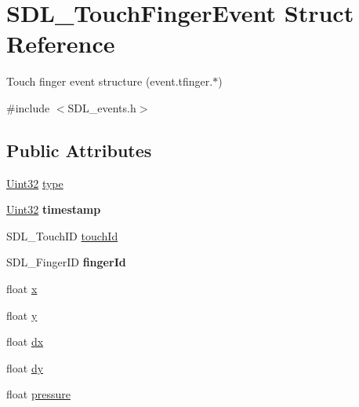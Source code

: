 \hypertarget{struct_s_d_l___touch_finger_event}{}\section{S\+D\+L\+\_\+\+Touch\+Finger\+Event Struct Reference}
\label{struct_s_d_l___touch_finger_event}


Touch finger event structure (event.\+tfinger.$\ast$)  




{\ttfamily \#include $<$S\+D\+L\+\_\+events.\+h$>$}

\subsection*{Public Attributes}
\begin{DoxyCompactItemize}
\item 
\hyperlink{_s_d_l__stdinc_8h_add440eff171ea5f55cb00c4a9ab8672d}{Uint32} \hyperlink{struct_s_d_l___touch_finger_event_a3883218fa3426065ca66086c100edbfa}{type}
\item 
\hypertarget{struct_s_d_l___touch_finger_event_abde2ab5cb013bbd21e37a65e2f8fa666}{}\hyperlink{_s_d_l__stdinc_8h_add440eff171ea5f55cb00c4a9ab8672d}{Uint32} {\bfseries timestamp}\label{struct_s_d_l___touch_finger_event_abde2ab5cb013bbd21e37a65e2f8fa666}

\item 
S\+D\+L\+\_\+\+Touch\+I\+D \hyperlink{struct_s_d_l___touch_finger_event_ad7a6f39ec9af1bf47b160d18314edd70}{touch\+Id}
\item 
\hypertarget{struct_s_d_l___touch_finger_event_a8616d46ed19906e3ee90a4d481d3a284}{}S\+D\+L\+\_\+\+Finger\+I\+D {\bfseries finger\+Id}\label{struct_s_d_l___touch_finger_event_a8616d46ed19906e3ee90a4d481d3a284}

\item 
float \hyperlink{struct_s_d_l___touch_finger_event_a0ce44b1342220fa17e9b9b4a77c2c906}{x}
\item 
float \hyperlink{struct_s_d_l___touch_finger_event_ac2bb8af638d2927a8e13f6ffe8f9384e}{y}
\item 
float \hyperlink{struct_s_d_l___touch_finger_event_ac6acac209d6e2bd659fdb6760081393d}{dx}
\item 
float \hyperlink{struct_s_d_l___touch_finger_event_a9c0320c5f18a6b9d10da657e166608c9}{dy}
\item 
float \hyperlink{struct_s_d_l___touch_finger_event_ab4fca822d0807b5748dbae8d3cc56524}{pressure}
\end{DoxyCompactItemize}


